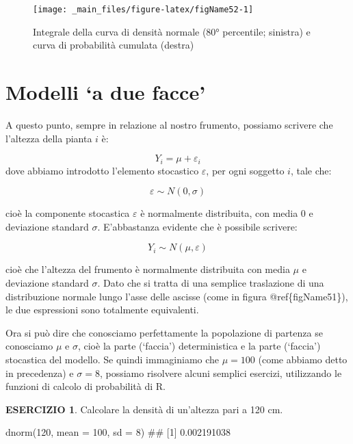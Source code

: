 \documentclass[a4paper,12pt,oneside]{book}
\newenvironment{Shaded}{}{}
\newcommand{\KeywordTok}[1]{#1}
\newcommand{\DataTypeTok}[1]{#1}
\newcommand{\DecValTok}[1]{#1}
\newcommand{\CommentTok}[1]{#1}
\newcommand{\NormalTok}[1]{#1}
\begin{document}
\begin{figure}

{\centering \texttt{[image: \_main\_files/figure-latex/figName52-1]} 

}

\caption{Integrale della curva di densità normale (80° percentile; sinistra) e curva di probabilità cumulata (destra)}\label{fig:figName52}
\end{figure}

\hypertarget{modelli-a-due-facce}{%
\section{Modelli `a due facce'}\label{modelli-a-due-facce}}

A questo punto, sempre in relazione al nostro frumento, possiamo scrivere che l'altezza della pianta \(i\) è:

\[Y_i = \mu + \varepsilon_i\]
dove abbiamo introdotto l'elemento stocastico \(\varepsilon\), per ogni soggetto \(i\), tale che:

\[ \varepsilon \sim N(0, \sigma) \]

cioè la componente stocastica \(\varepsilon\) è normalmente distribuita, con media 0 e deviazione standard \(\sigma\). E'abbastanza evidente che è possibile scrivere:

\[Y_i \sim N(\mu, \varepsilon)\]

cioè che l'altezza del frumento è normalmente distribuita con media \(\mu\) e deviazione standard \(\sigma\). Dato che si tratta di una semplice traslazione di una distribuzione normale lungo l'asse delle ascisse (come in figura @ref\{figName51\}), le due espressioni sono totalmente equivalenti.

Ora si può dire che conosciamo perfettamente la popolazione di partenza se conosciamo \(\mu\) e \(\sigma\), cioè la parte (`faccia') deterministica e la parte (`faccia') stocastica del modello. Se quindi immaginiamo che \(\mu = 100\) (come abbiamo detto in precedenza) e \(\sigma = 8\), possiamo risolvere alcuni semplici esercizi, utilizzando le funzioni di calcolo di probabilità di R.

\textbf{ESERCIZIO 1}. Calcolare la densità di un'altezza pari a 120 cm.

\begin{Shaded}
\begin{Highlighting}[]
\KeywordTok{dnorm}\NormalTok{(}\DecValTok{120}\NormalTok{, }\DataTypeTok{mean =} \DecValTok{100}\NormalTok{, }\DataTypeTok{sd =} \DecValTok{8}\NormalTok{)}
\CommentTok{## [1] 0.002191038}
\end{Highlighting}
\end{Shaded}
\end{document}
